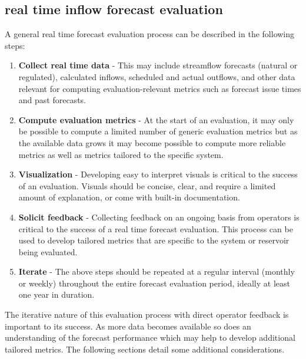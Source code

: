 \documentclass[MLA,Times1COL, hidelinks, doublespace]{WileyNJDv5} %
\begin{document}
\subsection{real time inflow forecast evaluation}
A general real time forecast evaluation process can be described in the following steps:
\begin{enumerate}
    \item \textbf{Collect real time data} - This may include streamflow forecasts (natural or regulated), calculated inflows, scheduled and actual outflows, and other data relevant for computing evaluation-relevant metrics such as forecast issue times and past forecasts. 
    \item \textbf{Compute evaluation metrics} - At the start of an evaluation, it may only be possible to compute a limited number of generic evaluation metrics but as the available data grows it may become possible to compute more reliable metrics as well as metrics tailored to the specific system. 
    \item \textbf{Visualization} - Developing easy to interpret visuals is critical to the success of an evaluation. Visuals should be concise, clear, and require a limited amount of explanation, or come with built-in documentation. 
    \item \textbf{Solicit feedback} - Collecting feedback on an ongoing basis from operators is critical to the success of a real time forecast evaluation. This process can be used to develop tailored metrics that are specific to the system or reservoir being evaluated. 
    \item \textbf{Iterate} - The above steps should be repeated at a regular interval (monthly or weekly) throughout the entire forecast evaluation period, ideally at least one year in duration. 
\end{enumerate}

The iterative nature of this evaluation process with direct operator feedback is important to its success. As more data becomes available so does an understanding of the forecast performance which may help to develop additional tailored metrics. The following sections detail some additional considerations.

\end{document}
